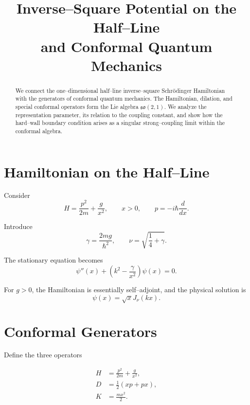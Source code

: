 \documentclass[11pt,a4paper]{article}
\title{\textbf{Inverse–Square Potential on the Half–Line\\
and Conformal Quantum Mechanics}}
\author{}
\date{}
\begin{document}
\maketitle

\begin{abstract}
We connect the one–dimensional half–line inverse–square
Schrödinger Hamiltonian with the generators of conformal quantum mechanics.
The Hamiltonian, dilation, and special conformal operators
form the Lie algebra $\mathfrak{so}(2,1)$.
We analyze the representation parameter,
its relation to the coupling constant,
and show how the hard–wall boundary condition arises
as a singular strong–coupling limit within the conformal algebra.
\end{abstract}

\section{Hamiltonian on the Half–Line}

Consider
\begin{equation}
H
=
\frac{p^2}{2m}
+
\frac{g}{x^2},
\qquad x>0,
\qquad p=-i\hbar\frac{d}{dx}.
\end{equation}

Introduce
\begin{equation}
\gamma=\frac{2mg}{\hbar^2},
\qquad
\nu=\sqrt{\frac{1}{4}+\gamma}.
\end{equation}

The stationary equation becomes
\begin{equation}
\psi''(x)+\left(k^2-\frac{\gamma}{x^2}\right)\psi(x)=0.
\end{equation}

For $g>0$, the Hamiltonian is essentially self–adjoint,
and the physical solution is
\begin{equation}
\psi(x)=\sqrt{x}J_\nu(kx).
\end{equation}

\section{Conformal Generators}

Define the three operators

\begin{align}
H &= \frac{p^2}{2m}+\frac{g}{x^2}, \\
D &= \frac{1}{2}(xp+px), \\
K &= \frac{m x^2}{2}.
\end{align}
\end{document}
